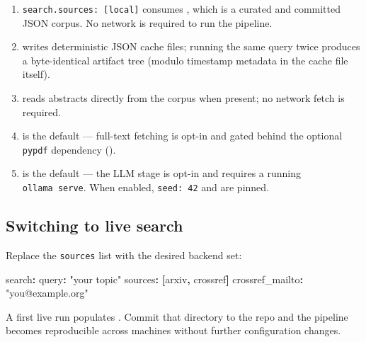 \documentclass[
]{article}
\newenvironment{Shaded}{}{}
\newcommand{\AttributeTok}[1]{\textcolor[rgb]{0.49,0.56,0.16}{#1}}
\newcommand{\FunctionTok}[1]{\textcolor[rgb]{0.02,0.16,0.49}{#1}}
\newcommand{\KeywordTok}[1]{\textcolor[rgb]{0.00,0.44,0.13}{\textbf{#1}}}
\newcommand{\StringTok}[1]{\textcolor[rgb]{0.25,0.44,0.63}{#1}}
\providecommand{\tightlist}{%
  \setlength{\itemsep}{0pt}\setlength{\parskip}{0pt}}
\begin{document}
\begin{enumerate}
\def\labelenumi{\arabic{enumi}.}
\tightlist
\item
  \texttt{search.sources:\ {[}local{]}} consumes
  , which is a curated and committed JSON
  corpus. No network is required to run the pipeline.
\item
   writes deterministic
  JSON cache files; running the same query twice produces a
  byte-identical artifact tree (modulo timestamp metadata in the cache
  file itself).
\item
   reads abstracts directly
  from the corpus when present; no network fetch is required.
\item
   is the default ---
  full-text fetching is opt-in and gated behind the optional
  \texttt{pypdf} dependency ().
\item
   is the default --- the LLM stage is
  opt-in and requires a running \texttt{ollama\ serve}. When enabled,
  \texttt{seed:\ 42} and  are pinned.
\end{enumerate}

\subsection{Switching to live search}\label{switching-to-live-search}

Replace the \texttt{sources} list with the desired backend set:

\begin{Shaded}
\begin{Highlighting}[]
\FunctionTok{search}\KeywordTok{:}
\AttributeTok{  }\FunctionTok{query}\KeywordTok{:}\AttributeTok{ }\StringTok{"your topic"}
\AttributeTok{  }\FunctionTok{sources}\KeywordTok{:}\AttributeTok{ }\KeywordTok{[}\AttributeTok{arxiv}\KeywordTok{,}\AttributeTok{ crossref}\KeywordTok{]}
\AttributeTok{  }\FunctionTok{crossref\_mailto}\KeywordTok{:}\AttributeTok{ }\StringTok{"you@example.org"}
\end{Highlighting}
\end{Shaded}

A first live run populates . Commit that
directory to the repo and the pipeline becomes reproducible across
machines without further configuration changes.
\end{document}
